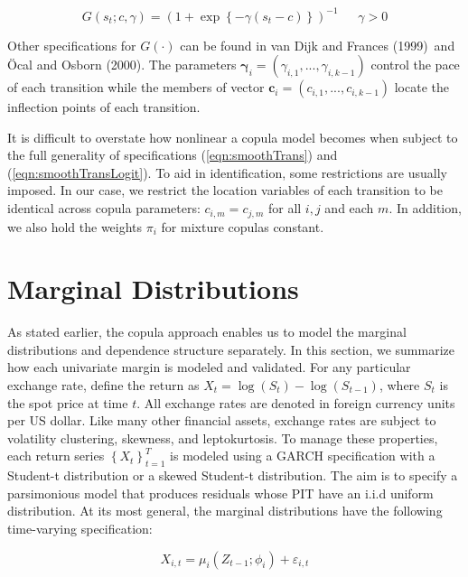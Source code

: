 \documentclass[12pt]{article}
\begin{document}
\begin{equation} \label{eqn:smoothTransLogit}
G\left(s_{t}; c, \gamma\right) = \left(1+\exp\left\{ -\gamma \left(
s_{t}-c\right) \right\}\right)^{-1}~~~~~~~\gamma > 0
\end{equation}

Other specifications for $G\left( \cdot \right) $ can be found in
van Dijk and Frances (1999)\ and \"{O}cal and Osborn (2000). The parameters
$\boldsymbol{\gamma}_{i} = \left(\gamma_{i,1},...,\gamma_{i,k-1}\right)$
control the pace of each transition while the members of vector
$\mathbf{c}_{i} = \left(c_{i,1},...,c_{i,k-1}\right)$ locate the
inflection points of each transition.

It is difficult to overstate how nonlinear a copula model becomes when
subject to the full generality of specifications (\ref{eqn:smoothTrans})
and (\ref{eqn:smoothTransLogit}). To aid in identification, some
restrictions are usually imposed. In our case, we restrict the location
variables of each transition to be identical across copula parameters:
$c_{i,m}=c_{j,m}$ for all $i,j$ and each $m$. In addition, we also hold
the weights $\pi_{i}$ for mixture copulas constant.

\section{Marginal Distributions}

As stated earlier, the copula approach enables us to model the marginal
distributions and dependence structure separately. In this section, we
summarize how each univariate margin is modeled and validated. For any
particular exchange rate, define the return as
$X_{t} = \log \left(S_{t}\right) - \log\left(S_{t-1}\right)$, where
$S_{t}$ is the spot price at time $t$. All exchange rates are denoted in
foreign currency units per US dollar. Like many other financial assets,
exchange rates are subject to volatility clustering, skewness, and
leptokurtosis. To manage these properties, each return series
$\left\{X_{t}\right\}_{t=1}^{T}$ is modeled using a GARCH specification
with a Student-t distribution or a skewed Student-t distribution. The aim
is to specify a parsimonious model that produces residuals whose PIT have
an i.i.d uniform distribution. At its most general, the marginal
distributions have the following time-varying specification:

\begin{equation} \label{eqn:marginalModel}
X_{i,t} = \mu_{i}\left(Z_{t - 1}; \phi_{i}\right) + \varepsilon_{i,t}
\end{equation}
\end{document}
